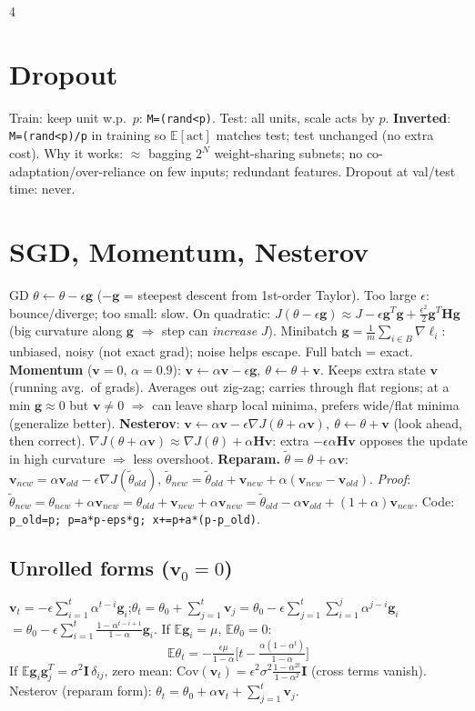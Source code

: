 \documentclass[8pt,landscape]{extarticle}
\newcommand{\Hm}{\mathbf{H}}
\newcommand{\g}{\mathbf{g}}
\newcommand{\vv}{\mathbf{v}}
\newcommand{\E}{\mathbb{E}}
\begin{document}
\begin{multicols*}{4}
\section{Dropout}
Train: keep unit w.p.\ $p$: \texttt{M=(rand<p)}. Test: all units, scale acts by $p$. \textbf{Inverted}: \texttt{M=(rand<p)/p} in training so $\E[\text{act}]$ matches test; test unchanged (no extra cost). Why it works: $\approx$ bagging $2^N$ weight-sharing subnets; no co-adaptation/over-reliance on few inputs; redundant features. Dropout at val/test time: never.

\section{SGD, Momentum, Nesterov}
GD $\theta\leftarrow\theta-\epsilon\g$ ($-\g$ = steepest descent from 1st-order Taylor). Too large $\epsilon$: bounce/diverge; too small: slow. On quadratic: $J(\theta-\epsilon\g)\approx J-\epsilon\g^T\g+\frac{\epsilon^2}2\g^T\Hm\g$ (big curvature along $\g$ $\Rightarrow$ step can \emph{increase} $J$). Minibatch $\g=\frac1m\sum_{i\in B}\nabla\ell_i$: unbiased, noisy (not exact grad); noise helps escape. Full batch = exact.
\textbf{Momentum} ($\vv{=}0$, $\alpha{=}0.9$): $\boxed{\vv\leftarrow\alpha\vv-\epsilon\g,\ \theta\leftarrow\theta+\vv}$. Keeps extra state $\vv$ (running avg.\ of grads). Averages out zig-zag; carries through flat regions; at a min $\g\approx0$ but $\vv\ne0$ $\Rightarrow$ can leave sharp local minima, prefers wide/flat minima (generalize better).
\textbf{Nesterov}: $\boxed{\vv\leftarrow\alpha\vv-\epsilon\nabla J(\theta+\alpha\vv),\ \theta\leftarrow\theta+\vv}$ (look ahead, then correct). $\nabla J(\theta+\alpha\vv)\approx\nabla J(\theta)+\alpha\Hm\vv$: extra $-\epsilon\alpha\Hm\vv$ opposes the update in high curvature $\Rightarrow$ less overshoot.
\textbf{Reparam.} $\tilde\theta=\theta+\alpha\vv$: $\vv_{new}=\alpha\vv_{old}-\epsilon\nabla J(\tilde\theta_{old})$, $\tilde\theta_{new}=\tilde\theta_{old}+\vv_{new}+\alpha(\vv_{new}-\vv_{old})$.
\emph{Proof}: $\tilde\theta_{new}=\theta_{new}+\alpha\vv_{new}=\theta_{old}+\vv_{new}+\alpha\vv_{new}=\tilde\theta_{old}-\alpha\vv_{old}+(1+\alpha)\vv_{new}$.
Code: \texttt{p\_old=p; p=a*p-eps*g; x+=p+a*(p-p\_old)}.

\subsection{Unrolled forms ($\vv_0=0$)}
$\vv_t=-\epsilon\sum_{i=1}^t\alpha^{t-i}\g_i$;\quad $\theta_t=\theta_0+\sum_{j=1}^t\vv_j=\theta_0-\epsilon\sum_{j=1}^t\sum_{i=1}^j\alpha^{j-i}\g_i$
$=\theta_0-\epsilon\sum_{i=1}^t\frac{1-\alpha^{t-i+1}}{1-\alpha}\g_i$. If $\E\g_i=\mu$, $\E\theta_0=0$:
\[\E\theta_t=-\tfrac{\epsilon\mu}{1-\alpha}\Big[t-\tfrac{\alpha(1-\alpha^t)}{1-\alpha}\Big]\]
If $\E\g_i\g_j^T=\sigma^2\mathbf I\,\delta_{ij}$, zero mean: $\text{Cov}(\vv_t)=\epsilon^2\sigma^2\frac{1-\alpha^{2t}}{1-\alpha^2}\mathbf I$ (cross terms vanish).
Nesterov (reparam form): $\theta_t=\theta_0+\alpha\vv_t+\sum_{j=1}^t\vv_j$.


\end{multicols*}
\end{document}
